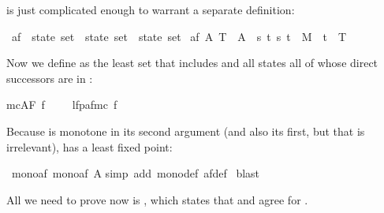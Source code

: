 \begin{isabellebody}
\begin{isamarkuptext}
is just complicated enough to warrant a separate definition:%
\end{isamarkuptext}%
\isamarkuptrue%
\isamarkupfalse%
\ af\ {\isacharcolon}{\isacharcolon}\ {\isachardoublequoteopen}state\ set\ {\isasymRightarrow}\ state\ set\ {\isasymRightarrow}\ state\ set{\isachardoublequoteclose}\ \isanewline
{\isachardoublequoteopen}af\ A\ T\ {\isasymequiv}\ A\ {\isasymunion}\ {\isacharbraceleft}s{\isachardot}\ {\isasymforall}t{\isachardot}\ {\isacharparenleft}s{\isacharcomma}\ t{\isacharparenright}\ {\isasymin}\ M\ {\isasymlongrightarrow}\ t\ {\isasymin}\ T{\isacharbraceright}{\isachardoublequoteclose}%
\begin{isamarkuptext}%
\noindent
Now we define  as the least set  that includes
 and all states all of whose direct successors are in :%
\end{isamarkuptext}%
\isamarkuptrue%
{\isachardoublequoteopen}mc{\isacharparenleft}AF\ f{\isacharparenright}\ \ \ \ {\isacharequal}\ lfp{\isacharparenleft}af{\isacharparenleft}mc\ f{\isacharparenright}{\isacharparenright}{\isachardoublequoteclose}%
\begin{isamarkuptext}%
\noindent
Because  is monotone in its second argument (and also its first, but
that is irrelevant),  has a least fixed point:%
\end{isamarkuptext}%
\isamarkuptrue%
\isamarkupfalse%
\ mono{\isacharunderscore}af{\isacharcolon}\ {\isachardoublequoteopen}mono{\isacharparenleft}af\ A{\isacharparenright}{\isachardoublequoteclose}\isanewline
%
\isadelimproof
%
\endisadelimproof
%
\isatagproof
{}\isamarkupfalse%
{\isacharparenleft}simp\ add{\isacharcolon}\ mono{\isacharunderscore}def\ af{\isacharunderscore}def{\isacharparenright}\isanewline
{}\isamarkupfalse%
\ blast\isanewline
{}\isamarkupfalse%
%
\endisatagproof
{\isafoldproof}%
%
\isadelimproof
%
\endisadelimproof
%
\isadelimproof
%
\endisadelimproof
%
\isatagproof
%
\endisatagproof
{\isafoldproof}%
%
\isadelimproof
%
\endisadelimproof
%
\isadelimproof
%
\endisadelimproof
%
\isatagproof
%
\endisatagproof
{\isafoldproof}%
%
\isadelimproof
%
\endisadelimproof
%
\begin{isamarkuptext}%
All we need to prove now is  , which states
that  and \isa{{\isasymTurnstile}} agree for \@.

\end{isamarkuptext}
\end{isabellebody}
